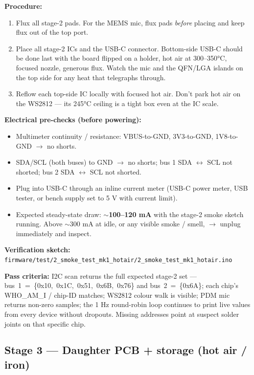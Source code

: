 \documentclass[11pt,a4paper]{article}
\begin{document}
\textbf{Procedure:}
\begin{enumerate}[nosep]
\item Flux all stage-2 pads. For the MEMS mic, flux pads \emph{before} placing and keep flux out of the top port.
\item Place all stage-2 ICs and the USB-C connector. Bottom-side USB-C should be done last with the board flipped on a holder, hot air at 300--350°C, focused nozzle, generous flux. Watch the mic and the QFN/LGA islands on the top side for any heat that telegraphs through.
\item Reflow each top-side IC locally with focused hot air. Don't park hot air on the WS2812 — its 245°C ceiling is a tight box even at the IC scale.
\end{enumerate}

\textbf{Electrical pre-checks (before powering):}
\begin{itemize}[nosep]
\item Multimeter continuity / resistance: VBUS-to-GND, 3V3-to-GND, 1V8-to-GND $\rightarrow$ no shorts.
\item SDA/SCL (both buses) to GND $\rightarrow$ no shorts; bus 1 SDA $\leftrightarrow$ SCL not shorted; bus 2 SDA $\leftrightarrow$ SCL not shorted.
\item Plug into USB-C through an inline current meter (USB-C power meter, USB tester, or bench supply set to 5 V with current limit).
\item Expected steady-state draw: \textbf{$\sim$100--120 mA} with the stage-2 smoke sketch running. Above $\sim$300 mA at idle, or any visible smoke / smell, $\rightarrow$ unplug immediately and inspect.
\end{itemize}

\textbf{Verification sketch:} \texttt{firmware/test/2\_smoke\_test\_mk1\_hotair/2\_smoke\_test\_mk1\_hotair.ino}

\textbf{Pass criteria:} I2C scan returns the full expected stage-2 set --- \mbox{bus 1 = \{0x10, 0x1C, 0x51, 0x6B, 0x76\}} and \mbox{bus 2 = \{0x6A\}}; each chip's WHO\_AM\_I / chip-ID matches; WS2812 colour walk is visible; PDM mic returns non-zero samples; the 1 Hz round-robin loop continues to print live values from every device without dropouts. Missing addresses point at suspect solder joints on that specific chip.

\subsection*{Stage 3 — Daughter PCB + storage (hot air / iron)}
\end{document}
